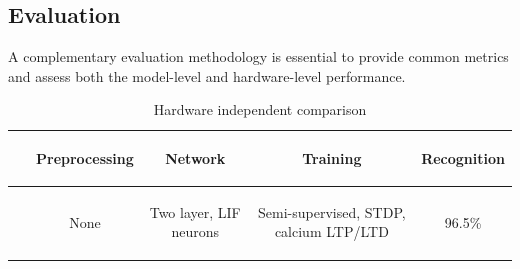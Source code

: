 \documentclass[journal]{journal}
\newenvironment{mycell}[1]
{
	\begin{minipage}{#1}
		\begin{center}
			\vspace*{0.15cm}
		}
		{
			\vspace*{0.1cm}
		\end{center}
	\end{minipage}
}
\begin{document}
	\subsection{Evaluation}
	A complementary evaluation methodology is essential to provide common metrics and assess both the model-level and hardware-level performance.

	\begin{table}[hbt!]
		\caption{Hardware independent comparison}
		\begin{center}
			\bgroup
			\def\arraystretch{1.5}
			\begin{tabular}{ l c c c c }
				$ $ &
				\begin{mycell}{1.9cm}Preprocessing\end{mycell} & 
				\begin{mycell}{3.5cm} Network\end{mycell} & 
				\begin{mycell}{3.5cm} Training \end{mycell} & 
				\begin{mycell}{3.5cm} Recognition \end{mycell} \\
				\hline
				
				\begin{mycell}{2.5cm}~\cite{brader2007learning} \end{mycell} & 
				\begin{mycell}{1.9cm} None \end{mycell} & %
				\begin{mycell}{3.5cm} Two layer, LIF neurons\end{mycell}&  %
				\begin{mycell}{3.5cm} Semi-supervised, STDP, calcium LTP/LTD\end{mycell}&  %
				\begin{mycell}{3.5cm} 96.5\% \end{mycell} \\%
				

\end{tabular}
\end{center}
\end{table}
\end{document}
